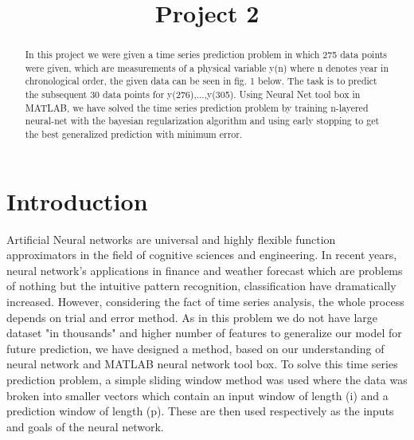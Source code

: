 \documentclass[conference]{IEEEtran}
\begin{document}
\title{Project 2}

\author{
	\and
{}
\and	
{}
	
	
}


\maketitle


\begin{abstract}
In this project we were given a time series prediction problem in which 275 data points were given, which are measurements of a physical variable y(n) where n denotes year in chronological order, the given data can be seen in fig. 1 below. The task is to predict the subsequent 30 data points for y(276),...,y(305). Using Neural Net tool box in MATLAB, we have solved the time series prediction problem by training n-layered neural-net with the bayesian regularization algorithm and using early stopping to get the best generalized prediction with minimum error.
\end{abstract}

\section{Introduction}
Artificial Neural networks are universal and highly flexible function approximators in the field of cognitive sciences and engineering. In recent years, neural network's applications in finance and weather forecast which are problems of nothing but the intuitive pattern recognition, classification have dramatically increased. However, considering the fact of time series analysis,  the whole process depends on trial and error method. As in this problem we do not have large dataset "in thousands" and higher number of features to generalize our model for future prediction, we have designed a method, based on our understanding of neural network and MATLAB neural network tool box. To solve this time series prediction problem, a simple sliding window method was used where the data was broken into smaller vectors which contain an input window of length (i) and a prediction window of length (p). These are then used respectively as the inputs and goals of the neural network.\\
\end{document}
